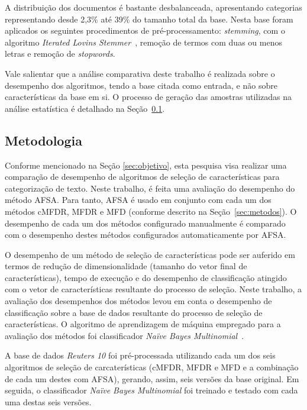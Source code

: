 \documentclass[conference]{IEEEtran}
\begin{document}
A distribuição dos documentos é bastante desbalanceada, apresentando categorias representando desde 2,3\% até 39\% do tamanho total da base. 
Nesta base foram aplicados os seguintes procedimentos de pré-processamento: \textit{stemming}, com o algoritmo \textit{Iterated Lovins Stemmer}~\cite{lovins1968development}, 
remoção de termos com duas ou menos letras e remoção de \textit{stopwords}.

Vale salientar que a análise comparativa deste trabalho é realizada sobre o desempenho dos algoritmos, tendo a base citada como entrada, e não sobre características da base em si. O processo de geração das amostras utilizadas na análise estatística é detalhado na Seção~\ref{sec:metodologia}.

\subsection{Metodologia}
\label{sec:metodologia}

Conforme mencionado na Seção \ref{sec:objetivo}, esta pesquisa visa realizar uma comparação de desempenho de algoritmos de seleção de características para categorização de texto.
Neste trabalho, é feita uma avaliação do desempenho do método AFSA. Para tanto, AFSA é usado em conjunto com cada um dos métodos cMFDR, MFDR e MFD (conforme descrito na Seção~\ref{sec:metodos}). O desempenho de cada um dos métodos configurado manualmente é comparado com o desempenho destes métodos configurados automaticamente por AFSA.

O desempenho de um método de seleção de características pode ser auferido em termos de redução de dimensionalidade (tamanho do vetor final de características), tempo de execução e do desempenho de classificação atingido com o vetor de características resultante do processo de seleção. Neste trabalho, a avaliação dos desempenhos dos métodos levou em conta o desempenho de classificação sobre a base de dados resultante do processo de seleção de características. O algoritmo de aprendizagem de máquina empregado para a avaliação dos métodos foi classificador \textit{Na\"ive Bayes Multinomial}~\cite{mccallum1998comparison}. 

A base de dados \textit{Reuters 10} foi pré-processada utilizando cada um dos seis algoritmos de seleção de carcaterísticas (cMFDR, MFDR e MFD e a combinação de cada um destes com AFSA), gerando, assim, seis versões da base original. Em seguida, o classificador \textit{Na\"ive Bayes Multinomial} foi treinado e testado com cada uma destas seis versões.
\end{document}
